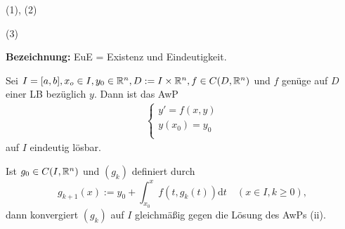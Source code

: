 \documentclass[a4paper,twoside,DIV15,BCOR12mm,chapterprefix=true,headings=twolinechapter]{scrbook}
\begin{document}
\begin{beweis}
(1), (2) 

(3) 
\end{beweis}

\textbf{Bezeichnung:} EuE = Existenz und Eindeutigkeit.
\begin{satz}
Sei $I = [a,b], x_o \in I, y_0 \in \mathbb{R}^n, D:= I \times \mathbb{R}^n, f\in C(D, \mathbb{R}^n)$ und $f$ genüge auf $D$ einer LB bezüglich $y$. Dann ist das AwP
\begin{align*}
\begin{cases}
y'=f(x,y)\\
y(x_0) = y_0\\
\end{cases}
\tag{ii}
\end{align*}
auf $I$ eindeutig lösbar.

Ist $g_0 \in C(I, \mathbb{R}^n)$ und $(g_k)$ definiert durch
\[ g_{k+1}(x) := y_0 + \int_{x_0}^x f(t, g_k(t)) \text{d}t \quad (x \in I, k \geq 0), \]
dann konvergiert $(g_k)$ auf $I$ gleichmäßig gegen die Lösung des AwPs (ii).
\end{satz}
\end{document}

